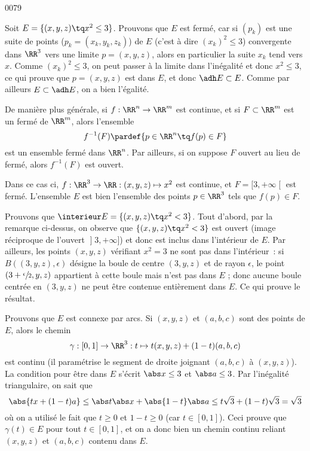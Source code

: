 
\begin{corrige}{0079}


Soit $E = \{ (x,y,z) \tq x^2 \leq 3\}$. Prouvons que $E$ est
fermé, car si $(p_k)$ est une suite de points ($p_k = (x_k,y_k,z_k)$)
de $E$ (c'est à dire $(x_k)^2 \leq 3$) convergente dans $\RR^3$ vers une limite
$p = (x,y,z)$, alors en particulier la suite $x_k$ tend vers
$x$. Comme $(x_k)^2 \leq 3$, on peut passer à la limite dans
l'inégalité et donc $x^2 \leq 3$, ce qui prouve que $p = (x,y,z)$ est
dans $E$, et donc $\adh E \subset E$. Comme par ailleurs $E \subset
\adh E$, on a bien l'égalité.

\begin{remark}
  De manière plus générale, si $f : \RR^n \to \RR^m$ est continue,
  et si $F \subset \RR^m$ est un fermé de $\RR^m$, alors l'ensemble
  \begin{equation*}
    f^{-1}(F) \pardef \{ p \in\RR^n \tq f(p) \in F \}
  \end{equation*}
  est un ensemble fermé dans $\RR^n$. Par ailleurs, si on suppose $F$
  ouvert au lieu de fermé, alors $f^{-1}(F)$ est ouvert.

  Dans ce cas ci, $f : \RR^3 \to \RR : (x,y,z) \mapsto x^2$ est
  continue, et $F = \mathopen[3,+\infty\mathclose[$ est
  fermé. L'ensemble $E$ est bien l'ensemble des points $p \in \RR^3$
  tels que $f(p) \in F$.
\end{remark}

Prouvons que $\interieur E = \{ (x,y,z) \tq x^2 < 3\}$. Tout
d'abord, par la remarque ci-dessus, on observe que $\{ (x,y,z) \tq
x^2 < 3\}$ est ouvert (image réciproque de l'ouvert
$\mathopen]3,+\infty\mathclose]$) et donc est inclus dans l'intérieur
de $E$. Par ailleurs, les points $(x,y,z)$ vérifiant $x^2 = 3$ ne sont
pas dans l'intérieur~: si $B((3,y,z),\epsilon)$ désigne la boule de
centre $(3,y,z)$ et de rayon $\epsilon$, le point
$(3+\sfrac\epsilon2,y,z)$ appartient à cette boule mais n'est pas dans
$E$ ; donc aucune boule centrée en $(3,y,z)$ ne peut être contenue
entièrement dans $E$. Ce qui prouve le résultat.

Prouvons que $E$ est connexe par arcs. Si $(x,y,z)$ et $(a,b,c)$ sont
des points de $E$, alors le chemin
\begin{equation*}
  \gamma : [0,1] \to \RR^3 : t \mapsto t (x,y,z) + (1-t) (a,b,c)
\end{equation*}
est continu (il paramétrise le segment de droite joignant $(a,b,c)$ à
$(x,y,z)$). La condition pour être dans $E$ s'écrit $\abs x \leq 3$ et
$\abs a \leq 3$. Par l'inégalité triangulaire, on sait que
\begin{equation*}
  \abs{tx+(1-t)a} \leq \abs t \abs x + \abs{1-t} \abs a \leq t \sqrt3
  + (1-t) \sqrt 3 = \sqrt 3
\end{equation*}
où on a utilisé le fait que $t \geq 0$ et $1-t \geq 0$ (car $t \in
[0,1]$). Ceci prouve que $\gamma(t) \in E$ pour tout $t \in [0,1]$, et
on a donc bien un chemin continu reliant $(x,y,z)$ et $(a,b,c)$
contenu dans $E$.

\end{corrige}
